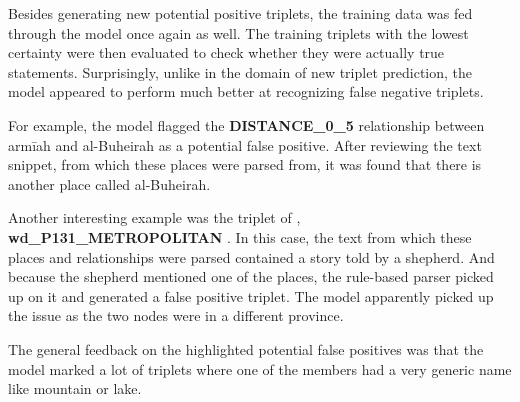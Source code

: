 Besides generating new potential positive triplets, the training data was fed through the model once again as well.
The training triplets with the lowest certainty were then evaluated to check whether they were actually true statements.
Surprisingly, unlike in the domain of new triplet prediction, the model appeared to perform much better at recognizing
false negative triplets.

For example, the model flagged the \textbf{DISTANCE\_0\_5} relationship between armīah and al-Buheirah as a potential false
positive.
After reviewing the text snippet, from which these places were parsed from, it was found that there is another
place called al-Buheirah.


Another interesting example was the triplet of , \textbf{wd\_P131\_METROPOLITAN} .
In this case, the text from which these places and relationships were parsed contained a story told by a shepherd.
And because the shepherd mentioned one of the places, the rule-based parser picked up on it and generated a false positive triplet.
The model apparently picked up the issue as the two nodes were in a different province.

The general feedback on the highlighted potential false positives was that the model marked a lot of
triplets where one of the members had a very generic name like mountain or lake.